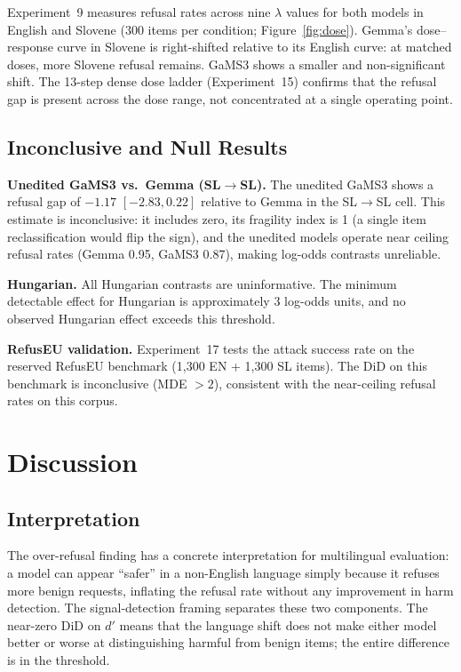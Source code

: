 \documentclass[11pt,letterpaper]{article}
\begin{document}
Experiment~9 measures refusal rates across nine $\lambda$ values for both models in English and Slovene (300 items per condition; Figure~\ref{fig:dose}). Gemma's dose--response curve in Slovene is right-shifted relative to its English curve: at matched doses, more Slovene refusal remains. GaMS3 shows a smaller and non-significant shift. The 13-step dense dose ladder (Experiment~15) confirms that the refusal gap is present across the dose range, not concentrated at a single operating point.

\subsection{Inconclusive and Null Results}

\textbf{Unedited GaMS3 vs.\ Gemma (SL$\to$SL).} The unedited GaMS3 shows a refusal gap of $-1.17$ $[-2.83, 0.22]$ relative to Gemma in the SL$\to$SL cell. This estimate is inconclusive: it includes zero, its fragility index is 1 (a single item reclassification would flip the sign), and the unedited models operate near ceiling refusal rates (Gemma 0.95, GaMS3 0.87), making log-odds contrasts unreliable.

\textbf{Hungarian.} All Hungarian contrasts are uninformative. The minimum detectable effect for Hungarian is approximately 3 log-odds units, and no observed Hungarian effect exceeds this threshold.

\textbf{RefusEU validation.} Experiment~17 tests the attack success rate on the reserved RefusEU benchmark (1,300 EN + 1,300 SL items). The DiD on this benchmark is inconclusive (MDE $> 2$), consistent with the near-ceiling refusal rates on this corpus.

\section{Discussion}
\label{sec:discussion}

\subsection{Interpretation}

The over-refusal finding has a concrete interpretation for multilingual evaluation: a model can appear ``safer'' in a non-English language simply because it refuses more benign requests, inflating the refusal rate without any improvement in harm detection. The signal-detection framing separates these two components. The near-zero DiD on $d'$ means that the language shift does not make either model better or worse at distinguishing harmful from benign items; the entire difference is in the threshold.
\end{document}

